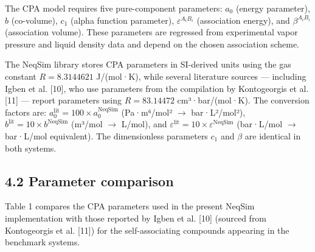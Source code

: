 \documentclass[review,3p]{elsarticle}
\begin{document}
The CPA model requires five pure-component parameters: $a_0$ (energy parameter), $b$ (co-volume), $c_1$ (alpha function parameter), $\varepsilon^{A_iB_i}$ (association energy), and $\beta^{A_iB_i}$ (association volume). These parameters are regressed from experimental vapor pressure and liquid density data and depend on the chosen association scheme.

The NeqSim library stores CPA parameters in SI-derived units using the gas constant $R = 8.3144621$ J/(mol·K), while several literature sources — including Igben et al. [10], who use parameters from the compilation by Kontogeorgis et al. [11] — report parameters using $R = 83.14472$ cm³·bar/(mol·K). The conversion factors are: $a_0^{\text{lit}} = 100 \times a_0^{\text{NeqSim}}$ (Pa·m⁶/mol² $\to$ bar·L²/mol²), $b^{\text{lit}} = 10 \times b^{\text{NeqSim}}$ (m³/mol $\to$ L/mol), and $\varepsilon^{\text{lit}} = 10 \times \varepsilon^{\text{NeqSim}}$ (bar·L/mol $\to$ bar·L/mol equivalent). The dimensionless parameters $c_1$ and $\beta$ are identical in both systems.

\subsection{4.2 Parameter comparison}

Table 1 compares the CPA parameters used in the present NeqSim implementation with those reported by Igben et al. [10] (sourced from Kontogeorgis et al. [11]) for the self-associating compounds appearing in the benchmark systems.
\end{document}
